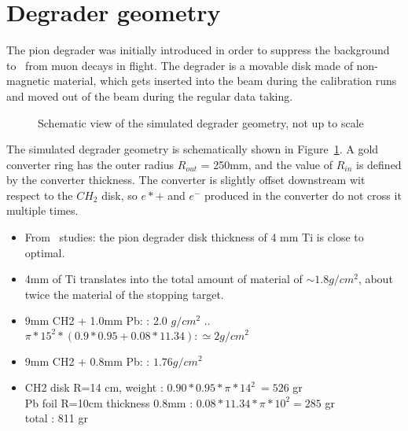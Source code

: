\section{Degrader geometry}

The pion degrader was initially introduced in order to suppress the background to \piplusenu\
from muon decays in flight. The degrader is a movable disk made of non-magnetic material,
which gets inserted into the beam during the calibration runs and moved out of the beam
during the regular data taking.

\begin{figure}[H]
  \caption{
    \label{figure:degrader_geometry_001}
    Schematic view of the simulated degrader geometry, not up to scale
  }
\end{figure}

The simulated degrader geometry is schematically shown in Figure~\ref{figure:degrader_geometry_001}.
A gold converter ring has the outer radius $R_{out}$ = 250mm, and the value of $R_{in}$ is defined
by the converter thickness. The converter is slightly offset downstream wit respect to the $CH_2$ disk,
so $e*+$ and $e^-$ produced in the converter do not cross it multiple times.

\begin{itemize}
\item 
  From \piplusenu\ studies: the pion degrader disk thickness of 4 mm Ti is close to optimal.
\item
  4mm of Ti translates into the total amount of material of $\sim 1.8 g/cm^2$,
  about twice the material of the stopping target.
\item
  9mm CH2 + 1.0mm Pb: : 2.0 $g/cm^2$   .. $\pi*15^2*(0.9*0.95 + 0.08*11.34): \simeq 2 g/cm^2$
\item
   9mm CH2 + 0.8mm Pb: : $1.76 g/cm^2$
 \item
   CH2 disk R=14 cm, weight        : $0.90*0.95*\pi*14^2 ~= 526$ gr \\
   Pb  foil R=10cm thickness 0.8mm : $0.08*11.34*\pi*10^2 = 285$ gr \\
   total                           : 811 gr
\end{itemize}

